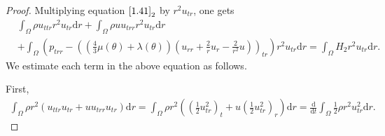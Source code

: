 \documentclass[10pt,a4paper]{amsart}
\newcommand{\dif}{\mathrm{d}}
\begin{document}
\begin{proof}
 Multiplying equation $\eqref{1.41}_2$ by $r^2 u_{tr}$, one gets
 \begin{align}\label{1.42}
& \int_{\Omega} \rho u_{ttr} r^2 u_{tr}\dif r  +\int_{\Omega} \rho u u_{trr} r^2 u_{tr}\dif r\nonumber\\
&+\int_{\Omega} \left(p_{trr} -\left(\left(\frac{4}{3} \mu(\theta)+\lambda(\theta)\right)\left(u_{rr}+\frac{2}{r}u_r-\frac{2}{r^2} u\right)\right)_{tr}\right) r^2 u_{tr}\dif r
 =\int_{\Omega} H_2 r^2 u_{tr}\dif r.
 \end{align}
 We estimate each term in the above equation as follows.

 First,
 \begin{align*}
 \int_{\Omega} \rho r^2 ( u_{ttr} u_{tr}+u  u_{trr} u_{tr}) \dif r =\int_{\Omega} \rho r^2 \left(  \left( \frac{1}{2} u_{tr}^2 \right)_t+u \left(\frac{1}{2} u_{tr}^2\right)_r\right) \dif r=\frac{\dif}{\dif t} \int_{\Omega} \frac{1}{2} \rho r^2 u_{tr}^2 \dif r.
 \end{align*}


\end{proof}
\end{document}
